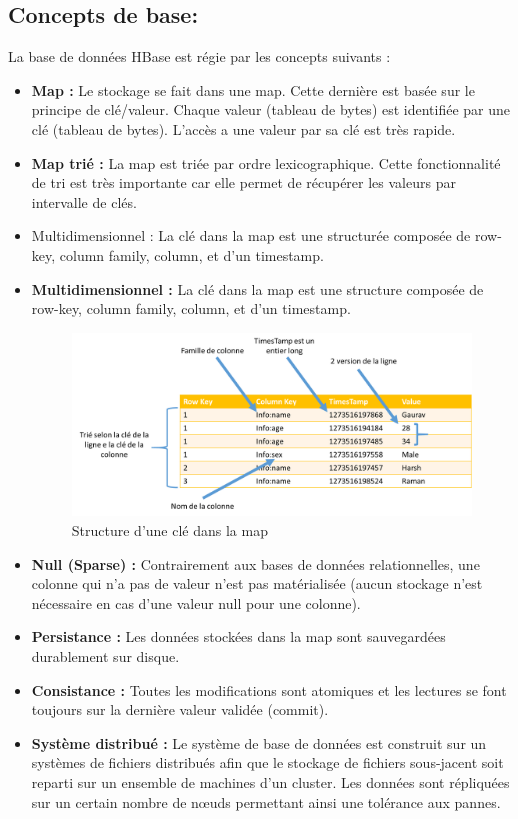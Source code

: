 \subsection{Concepts de base: }
La base de données HBase est régie par les concepts suivants :

\begin{itemize}[label=\textbullet]

\item \textbf{Map :} Le stockage se fait dans une map. Cette dernière est basée sur le principe de clé/valeur. Chaque valeur (tableau de bytes) est identifiée par une clé (tableau de bytes). L'accès a une valeur par sa clé est très rapide.

\item \textbf{Map trié :} La map est triée par ordre lexicographique. Cette fonctionnalité de tri est très importante car elle permet de récupérer les valeurs par intervalle de clés.
\item Multidimensionnel : La clé dans la map est une structurée composée de row-key, column family, column, et d'un timestamp.

\item \textbf{Multidimensionnel :} La clé dans la map est une structure composée de row-key,
column family, column, et d'un timestamp.

\begin{figure}[h]
	\centering
    \includegraphics[scale=0.4]{img/part2/2.1}
    \caption{Structure d'une clé dans la map}
\end{figure}

\item \textbf{Null (Sparse) :} Contrairement aux bases de données relationnelles, une colonne qui n'a pas de valeur n'est pas matérialisée (aucun stockage n'est nécessaire en cas d'une valeur null pour une colonne).

\item \textbf{Persistance :} Les données stockées dans la map sont sauvegardées durablement sur disque.

\item \textbf{Consistance :} Toutes les modifications sont atomiques et les lectures se font toujours sur la dernière valeur validée (commit).

\item \textbf{Système distribué :} Le système de base de données est construit sur un systèmes de fichiers distribués afin que le stockage de fichiers sous-jacent soit reparti sur un ensemble de machines d'un cluster. Les données sont répliquées sur un certain nombre de nœuds permettant ainsi une tolérance aux pannes.
\end{itemize}